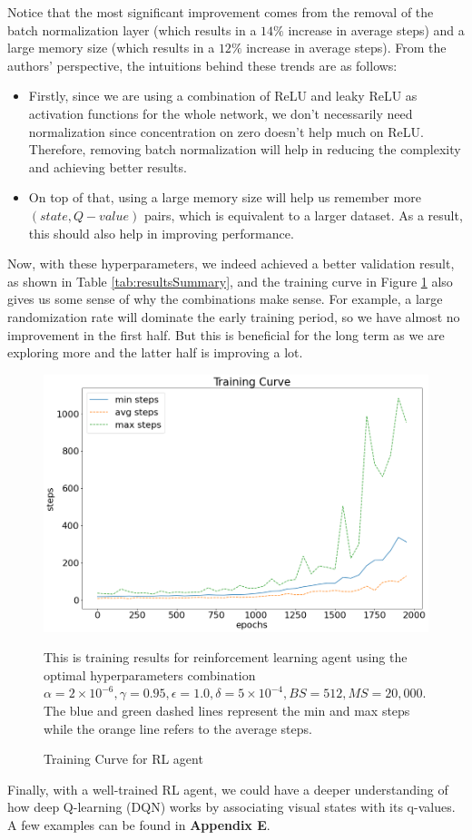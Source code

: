 \documentclass[letterpaper]{article} %
\begin{document}
\begin{itemize}
  Notice that the most significant improvement comes from the removal of the batch normalization layer (which results in a $14\%$ increase in average steps) and a large memory size (which results in a $12\%$ increase in average steps). From the authors' perspective, the intuitions behind these trends are as follows:
  \begin{itemize}
    \item 
    Firstly, since we are using a combination of ReLU and leaky ReLU as activation functions for the whole network, we don't necessarily need normalization since concentration on zero doesn't help much on ReLU. Therefore, removing batch normalization will help in reducing the complexity and achieving better results.
    \item 
    On top of that, using a large memory size will help us remember more $(state, Q-value)$ pairs, which is equivalent to a larger dataset. As a result, this should also help in improving performance.
  \end{itemize}
  Now, with these hyperparameters, we indeed achieved a better validation result, as shown in Table \ref{tab:resultsSummary}, and the training curve in Figure \ref{fig:tc} also gives us some sense of why the combinations make sense. For example, a large randomization rate will dominate the early training period, so we have almost no improvement in the first half. But this is beneficial for the long term as we are exploring more and the latter half is improving a lot.
 
  \begin{figure}[h!]
    \centering
    \includegraphics[width=0.9\linewidth]{figures/train_curve}
    \caption{Training Curve for RL agent}
    \medskip
    \footnotesize
    This is training results for reinforcement learning agent using the optimal hyperparameters combination $\alpha=2\times 10^{-6}, \gamma = 0.95, \epsilon=1.0,\delta=5\times 10^{-4}, BS=512, MS=20,000$. The blue and green dashed lines represent the min and max steps while the orange line refers to the average steps.
    \label{fig:tc}
  \end{figure}

  Finally, with a well-trained RL agent, we could have a deeper understanding of how deep Q-learning (DQN) works by associating visual states with its q-values. A few examples can be found in \textbf{Appendix E}.
\end{itemize}
\end{document}
